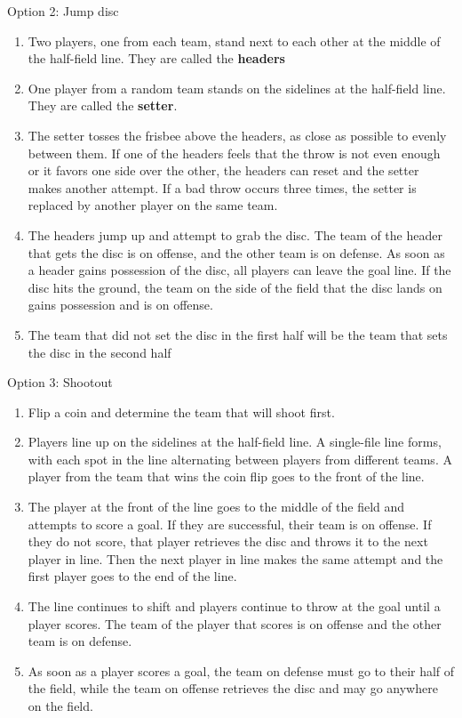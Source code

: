 \documentclass[10pt]{article}
\begin{document}
    Option 2: Jump disc
    \begin{enumerate}
        \item Two players, one from each team, stand next to each other at the middle of the half-field line. They are called the \textbf{headers}
        \item One player from a random team stands on the sidelines at the half-field line. They are called the \textbf{setter}.
        \item The setter tosses the frisbee above the headers, as close as possible to evenly between them. If one of the headers feels that the throw is not even enough or it favors one side over the other, the headers can reset and the setter makes another attempt. If a bad throw occurs three times, the setter is replaced by another player on the same team.
        \item The headers jump up and attempt to grab the disc. The team of the header that gets the disc is on offense, and the other team is on defense. As soon as a header gains possession of the disc, all players can leave the goal line. If the disc hits the ground, the team on the side of the field that the disc lands on gains possession and is on offense.
        \item The team that did not set the disc in the first half will be the team that sets the disc in the second half
    \end{enumerate}

    Option 3: Shootout
    \begin{enumerate}
        \item Flip a coin and determine the team that will shoot first.
        \item Players line up on the sidelines at the half-field line. A single-file line forms, with each spot in the line alternating between players from different teams. A player from the team that wins the coin flip goes to the front of the line.
        \item The player at the front of the line goes to the middle of the field and attempts to score a goal. If they are successful, their team is on offense. If they do not score, that player retrieves the disc and throws it to the next player in line. Then the next player in line makes the same attempt and the first player goes to the end of the line. 
        \item The line continues to shift and players continue to throw at the goal until a player scores. The team of the player that scores is on offense and the other team is on defense.
        \item As soon as a player scores a goal, the team on defense must go to their half of the field, while the team on offense retrieves the disc and may go anywhere on the field.
    \end{enumerate}
\end{document}
